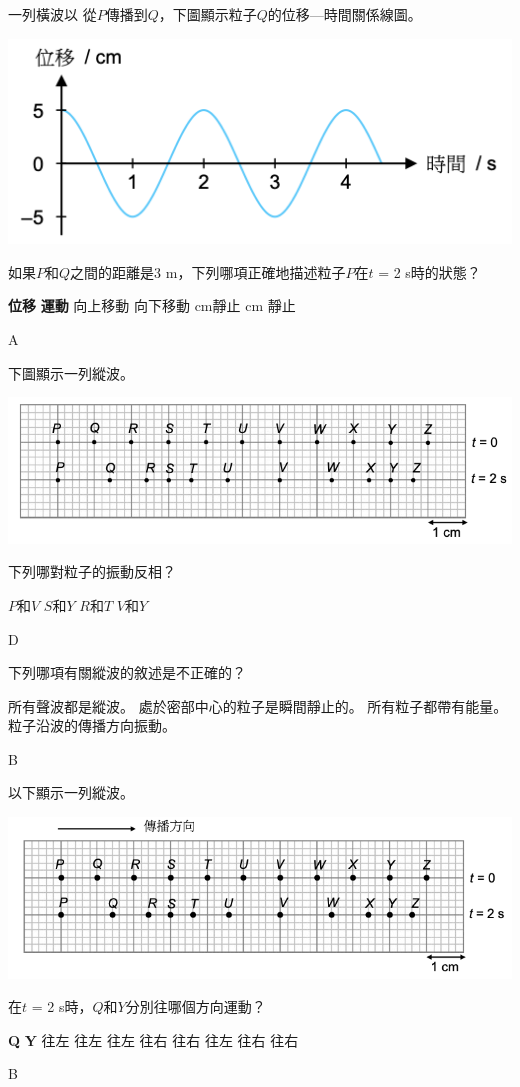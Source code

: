 {
    一列橫波以  從$P$傳播到$Q$，下圖顯示粒子$Q$的位移—時間關係線圖。
    \par{\par\centering\includegraphics[width=.45\textwidth]{./img/ch1_earlyclass_wave_mc_2024-05-13-16-13-07.png}\par}
    如果$P$和$Q$之間的距離是3 m，下列哪項正確地描述粒子$P$在$t$ = 2 s時的狀態？
    \begin{tasks}
        \task [] \textbf{位移} \tab\tab \textbf{運動}
        \tab\tab 向上移動
        \tab\tab 向下移動
         cm\tab\tab 靜止
         cm \tab\tab 靜止
    \end{tasks}
}{A}

{
    下圖顯示一列縱波。
    \par{\par\centering\includegraphics[width=.6\textwidth]{./img/ch1_earlyclass_wave_mc_2024-05-13-16-15-20.png}\par}
    下列哪對粒子的振動反相？
    \begin{tasks}
        \task $P$和$V$
        \task $S$和$Y$
        \task $R$和$T$
        \task $V$和$Y$
    \end{tasks}

}{D}

{
    下列哪項有關縱波的敘述是不正確的？
    \begin{tasks}
        \task 所有聲波都是縱波。
        \task 處於密部中心的粒子是瞬間靜止的。
        \task 所有粒子都帶有能量。
        \task 粒子沿波的傳播方向振動。
    \end{tasks}

}{B}

{
    以下顯示一列縱波。
    \par{\par\centering\includegraphics[width=.6\textwidth]{./img/ch1_earlyclass_wave_mc_2024-05-13-16-17-43.png}\par}
    在$t$ = 2 s時，$Q$和$Y$分別往哪個方向運動？
    \begin{tasks}
        \task [] \textbf{Q} \tab\tab \textbf{Y}
        \task 往左 \tab\tab 往左
        \task 往左 \tab\tab 往右
        \task 往右 \tab\tab 往左
        \task 往右 \tab\tab 往右
    \end{tasks}
}{B}

